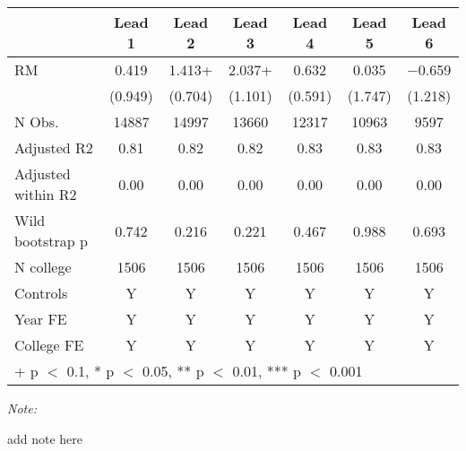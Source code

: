 \begin{table}
\centering
\begin{threeparttable}
\begin{tabular}[t]{lcccccc}
\toprule
  & Lead 1 & Lead 2 & Lead 3 & Lead 4 & Lead 5 & Lead 6\\
\midrule
RM & \num{0.419} & \num{1.413}+ & \num{2.037}+ & \num{0.632} & \num{0.035} & \num{-0.659}\\
 & (\num{0.949}) & (\num{0.704}) & (\num{1.101}) & (\num{0.591}) & (\num{1.747}) & (\num{1.218})\\
\midrule
N Obs. & \num{14887} & \num{14997} & \num{13660} & \num{12317} & \num{10963} & \num{9597}\\
Adjusted R2 & \num{0.81} & \num{0.82} & \num{0.82} & \num{0.83} & \num{0.83} & \num{0.83}\\
Adjusted within R2 & \num{0.00} & \num{0.00} & \num{0.00} & \num{0.00} & \num{0.00} & \num{0.00}\\
Wild bootstrap p & 0.742 & 0.216 & 0.221 & 0.467 & 0.988 & 0.693\\
N college & 1506 & 1506 & 1506 & 1506 & 1506 & 1506\\
Controls & Y & Y & Y & Y & Y & Y\\
Year FE & Y & Y & Y & Y & Y & Y\\
College FE & Y & Y & Y & Y & Y & Y\\
\bottomrule
\multicolumn{7}{l}{\rule{0pt}{1em}+ p $<$ 0.1, * p $<$ 0.05, ** p $<$ 0.01, *** p $<$ 0.001}\\
\end{tabular}
\begin{tablenotes}
\item \textit{Note: } 
\item add note here
\end{tablenotes}
\end{threeparttable}
\end{table}
